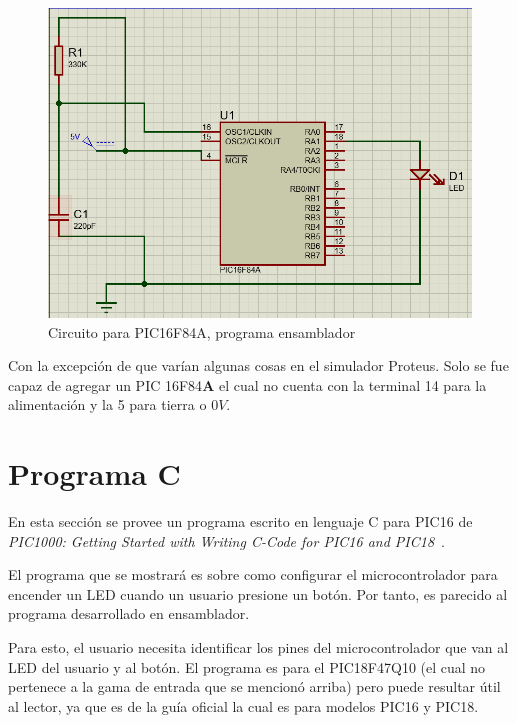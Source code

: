 \documentclass[conference]{IEEEtran}
\begin{document}
    \begin{figure}[H]
        \centering
        \includegraphics[width=0.3\paperwidth]{images/pic16f84a-assembly-sim}
        \caption{Circuito para PIC16F84A, programa ensamblador}\label{fig:figure3}
    \end{figure}

    \bigbreak

    Con la excepción de que varían algunas cosas en el simulador Proteus.
    Solo se fue capaz de agregar un PIC 16F84\textbf{A} el cual no cuenta con
    la terminal 14 para la alimentación y la 5 para tierra o $0V$.

    \section{Programa C}\label{sec:programa-c}

    En esta sección se provee un programa escrito en lenguaje C para PIC16 de
    \textit{PIC1000: Getting Started with Writing C-Code for PIC16 and PIC18}~\cite{microchip-c-program-2020}.

    \bigbreak

    El programa que se mostrará es sobre como configurar el microcontrolador
    para encender un LED cuando un usuario presione un botón. Por tanto, es
    parecido al programa desarrollado en ensamblador.

    \bigbreak

    Para esto, el usuario necesita identificar los pines del microcontrolador
    que van al LED del usuario y al botón. El programa es para el PIC18F47Q10
    (el cual no pertenece a la gama de entrada que se mencionó arriba) pero
    puede resultar útil al lector, ya que es de la guía oficial la cual es
    para modelos PIC16 y PIC18.
\end{document}
